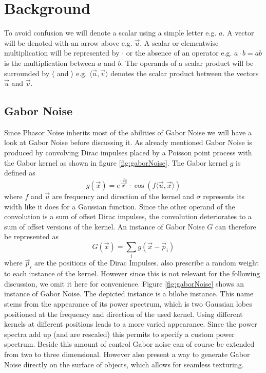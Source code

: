 \documentclass{utue} %
\begin{document}
\section{Background}
To avoid confusion we will denote a scalar using a simple letter e.g. $a$. A vector will be denoted with an arrow above e.g. $\vec{u}$. A scalar or elementwise multiplication will be represented by $\cdot$ or the absence of an operator e.g. $a\cdot b=ab$ is the multiplication between $a$ and $b$. The operands of a scalar product will be surrounded by $\langle$ and $\rangle$ e.g. $\langle\vec{u},\vec{v}\rangle$ denotes the scalar product between the vectors $\vec{u}$ and $\vec{v}$.
\subsection{Gabor Noise}
Since Phasor Noise inherits most of the abilities of Gabor Noise we will have a look at Gabor Noise before discussing it. As already mentioned Gabor Noise is produced by convolving Dirac impulses placed by a Poisson point process with the Gabor kernel as shown in figure \ref{fig:gaborNoise}. The Gabor kernel $g$ is defined as
$$
g(\vec{x}) = e^{\frac{||\vec{x}||}{\sigma^2}}\cdot \cos{(f\langle\vec{u},\vec{x}\rangle)}
$$
where $f$ and $\vec{u}$ are frequency and direction of the kernel and $\sigma$ represents its width like it does for a Gaussian function. Since the other operand of the convolution is a sum of offset Dirac impulses, the convolution deteriorates to a sum of offset versions of the kernel. An instance of Gabor Noise $G$ can therefore be represented as
$$
G(\vec{x}) = \sum_ig(\vec{x}-\vec{p}_i)
$$
where $\vec{p}_i$ are the positions of the Dirac Impulses. \citeauthor{gaborNoise} also prescribe a random weight to each instance of the kernel. However since this is not relevant for the following discussion, we omit it here for convenience. Figure \ref{fig:gaborNoise} shows an instance of Gabor Noise. The depicted instance is a bilobe instance. This name stems from the appearance of its power spectrum, which is two Gaussian lobes positioned at the frequency and direction of the used kernel. Using different kernels at different positions leads to a more varied appearance. Since the power spectra add up (and are rescaled) this permits to specify a custom power spectrum. Beside this amount of control Gabor noise can of course be extended from two to three dimensional. However \citeauthor{gaborNoise} also present a way to generate Gabor Noise directly on the surface of objects, which allows for seamless texturing.
\end{document}
